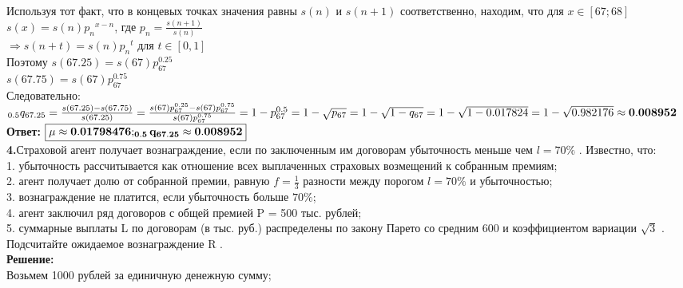 \documentclass{article}
\begin{document}
Используя тот факт, что в концевых точках значения равны $s(n)$ и  $s(n+1) $ соответственно, находим, что  для  $x \in [67;68] $\\

$s(x) = s(n) {p_n}^{x-n}$, где $p_n = \frac {s(n+1)} {s(n)} $\\



$\Rightarrow s(n+t) = s(n) {p_n}^{t}$ для $t \in [0,1]$\\

Поэтому $s(67.25) = s(67) p_{67}^{0.25}$\\
$s(67.75) = s(67) p_{67}^{0.75}$\\

Следовательно:\\

$ _{0.5}q_{67.25 } =   \frac { s(67.25) - s(67.75)} { s(67.25)} = \frac{  s(67) p_{67}^{0.25} -  s(67) p_{67}^{0.75} } { s(67) p_{67}^{0.75}}  = 
1-  p_{67}^{0.5} = 1-\sqrt{ p_{67}} =  1-\sqrt {1- q_{67}} =  1- \sqrt{1-0.017824} = 1-\sqrt{0.982176} \approx \bf 0.008952$ \\
 {\bf \large  Ответ:} $\boxed {\mu \approx \bf  0.01798476;  _{0.5}q_{67.25 } \approx \bf 0.008952}$\\
					    
					    

{\bf \large 4.}Страховой агент получает вознаграждение, если по заключенным им договорам убыточность меньше чем $l=70\%$ . Известно, что:\\
1. убыточность рассчитывается как отношение всех выплаченных страховых возмещений к собранным премиям;\\
2. агент получает долю от собранной премии, равную $f=\frac{1}{3}$ разности между порогом $l=70\%$ и убыточностью;\\
3. вознаграждение не платится, если убыточность больше $70\%$;\\
4. агент заключил ряд договоров с общей премией P = 500 тыс. рублей;\\
5. суммарные выплаты L по договорам (в тыс. руб.) распределены по закону Парето со средним 600 и коэффициентом вариации $\sqrt3$ .\\
Подсчитайте ожидаемое вознаграждение R .\\

{\bf \large Решение:}\\

Возьмем 1000 рублей за единичную денежную сумму;\\
\end{document}
